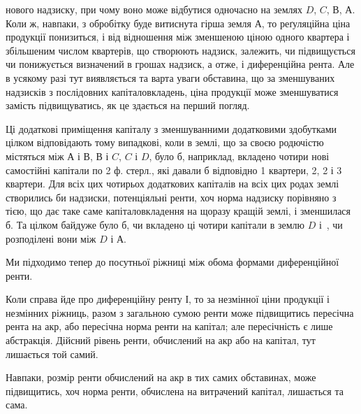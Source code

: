 \parcont{}  %
нового надзиску, при чому воно може відбутися одночасно на землях $D$, $C$, $В$, $А$.
Коли ж, навпаки, з обробітку буде витиснута гірша земля $А$, то реґуляційна
ціна продукції понизиться, і від відношення між зменшеною ціною одного
квартера і збільшеним числом квартерів, що створюють надзиск, залежить, чи
підвищується чи понижується визначений в грошах надзиск, а отже, і диференційна
рента. Але в усякому разі тут виявляється та варта уваги обставина,
що за зменшуваних надзисків з послідовних капіталовкладень, ціна продукції
може зменшуватися замість підвищуватись, як це здається на перший погляд.

Ці додаткові приміщення капіталу з зменшуванними додатковими здобутками
цілком відповідають тому випадкові, коли в землі, що за своєю родючістю
містяться між $А$ і $В$, $В$ і $C$, $C$ і $D$, було б, наприклад, вкладено чотири нові
самостійні капітали по 2 ф. стерл., які давали б відповідно 1 квартери,
2, 2 і 3 квартери. Для всіх цих чотирьох додаткових капіталів на всіх
цих родах землі створились би надзиски, потенціяльні ренти, хоч норма надзиску
порівняно з тією, що дає таке саме капіталовкладення на щоразу кращій землі,
і зменшилася б. Та цілком байдуже було б, чи вкладено ці чотири капітали
в землю $D$ і~, чи розподілені вони між $D$ і $А$.

Ми підходимо тепер до посутньої ріжниці між обома формами диференційної
ренти.

Коли справа йде про диференційну ренту І, то за незмінної ціни продукції
і незмінних ріжниць, разом з загальною сумою ренти може підвищитись
пересічна рента на акр, або пересічна норма ренти на капітал; але пересічність
є лише абстракція. Дійсний рівень ренти, обчислений на акр або на капітал,
тут лишається той самий.

Навпаки, розмір ренти обчислений на акр в тих самих обставинах, може
підвищитись, хоч норма ренти, обчислена на витрачений капітал, лишається
та сама.

